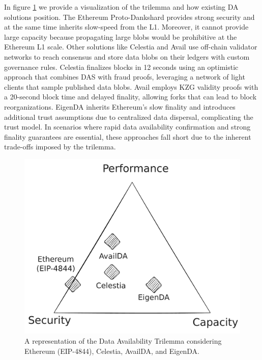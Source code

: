 \documentclass[11pt]{article}
\begin{document}
In figure \ref{fig:da-trilemma} we provide a visualization of the trilemma and how existing DA solutions position. The Ethereum Proto-Dankshard provides strong security and at the same time inherits slow-speed from the L1. Moreover, it cannot provide large capacity because propagating large blobs would be prohibitive at the Ethereum L1 scale. Other solutions like Celestia and Avail use off-chain validator networks to reach consensus and store data blobs on their ledgers with custom governance rules. Celestia finalizes blocks in 12 seconds using an optimistic approach that combines DAS with fraud proofs, leveraging a network of light clients that sample published data blobs. Avail employs KZG validity proofs with a 20-second block time and delayed finality, allowing forks that can lead to block reorganizations. EigenDA inherits Ethereum’s slow finality and introduces additional trust assumptions due to centralized data dispersal, complicating the trust model. In scenarios where rapid data availability confirmation and strong finality guarantees are essential, these approaches fall short due to the inherent trade-offs imposed by the trilemma.

\begin{figure}[htp]
    \centering
    \includegraphics[scale=0.28]{da-trilemma.pdf}
    \caption{A representation of the Data Availability Trilemma considering Ethereum (EIP-4844), Celestia, AvailDA, and EigenDA.}
    \label{fig:da-trilemma}
\end{figure}
\end{document}

